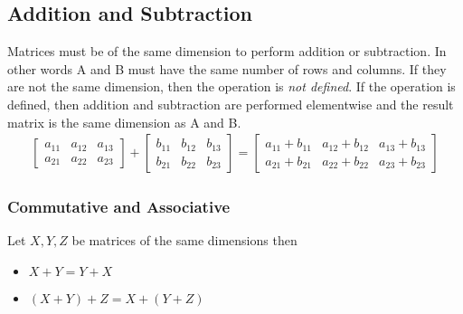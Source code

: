 \documentclass[14pt]{extarticle}
\begin{document}
\subsection{Addition and Subtraction}
Matrices must be of the same dimension to perform addition or subtraction. In other words A and B must have the same number of rows and columns. If they are not the same dimension, then the operation is \textit{not defined}. If the operation is defined, then addition and subtraction are performed elementwise and the result matrix is the same dimension as A and B.
\begin{align*}
	\begin{bmatrix}
		a_{1 1} & a_{1 2} & a_{1 3} \\
		a_{2 1} & a_{2 2} & a_{2 3}
	\end{bmatrix} + 
	\begin{bmatrix}
		b_{1 1} & b_{1 2} & b_{1 3} \\
		b_{2 1} & b_{2 2} & b_{2 3}
	\end{bmatrix} = 
	\begin{bmatrix}
		a_{1 1}+b_{1 1} & a_{1 2}+b_{1 2} & a_{1 3}+b_{1 3} \\
		a_{2 1}+b_{2 1} & a_{2 2}+b_{2 2} & a_{2 3}+b_{2 3}
	\end{bmatrix}
\end{align*}
\subsubsection*{Commutative and Associative}
Let $X,Y,Z$ be matrices of the same dimensions then
\begin{itemize}
	\item $X+Y = Y+X$
	\item $(X+Y)+Z= X+(Y+Z)$
\end{itemize}
\end{document}

